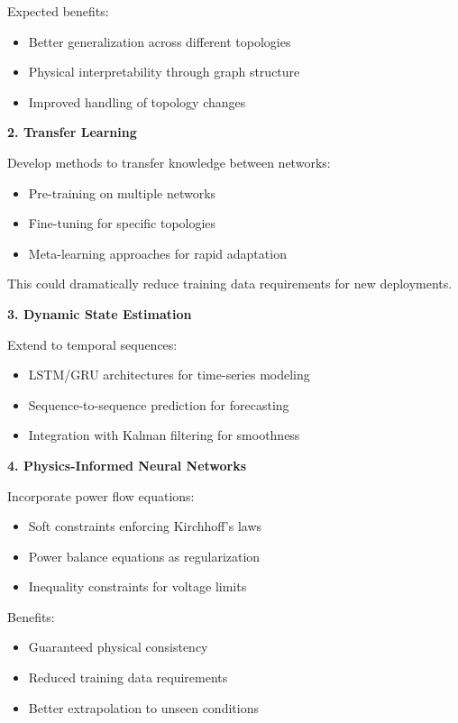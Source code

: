 \documentclass[12pt,a4paper]{report}
\begin{document}
Expected benefits:
\begin{itemize}
    \item Better generalization across different topologies
    \item Physical interpretability through graph structure
    \item Improved handling of topology changes
\end{itemize}

\textbf{2. Transfer Learning}

Develop methods to transfer knowledge between networks:
\begin{itemize}
    \item Pre-training on multiple networks
    \item Fine-tuning for specific topologies
    \item Meta-learning approaches for rapid adaptation
\end{itemize}

This could dramatically reduce training data requirements for new deployments.

\textbf{3. Dynamic State Estimation}

Extend to temporal sequences:
\begin{itemize}
    \item LSTM/GRU architectures for time-series modeling
    \item Sequence-to-sequence prediction for forecasting
    \item Integration with Kalman filtering for smoothness
\end{itemize}

\textbf{4. Physics-Informed Neural Networks}

Incorporate power flow equations:
\begin{itemize}
    \item Soft constraints enforcing Kirchhoff's laws
    \item Power balance equations as regularization
    \item Inequality constraints for voltage limits
\end{itemize}

Benefits:
\begin{itemize}
    \item Guaranteed physical consistency
    \item Reduced training data requirements
    \item Better extrapolation to unseen conditions
\end{itemize}
\end{document}
